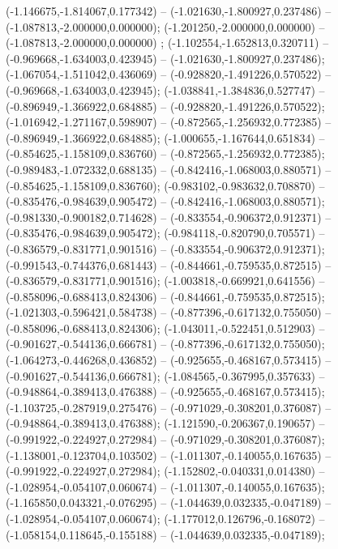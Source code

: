  (-1.146675,-1.814067,0.177342) -- (-1.021630,-1.800927,0.237486) -- (-1.087813,-2.000000,0.000000);
 (-1.201250,-2.000000,0.000000) -- (-1.087813,-2.000000,0.000000) ;
 (-1.102554,-1.652813,0.320711) -- (-0.969668,-1.634003,0.423945) -- (-1.021630,-1.800927,0.237486);
 (-1.067054,-1.511042,0.436069) -- (-0.928820,-1.491226,0.570522) -- (-0.969668,-1.634003,0.423945);
 (-1.038841,-1.384836,0.527747) -- (-0.896949,-1.366922,0.684885) -- (-0.928820,-1.491226,0.570522);
 (-1.016942,-1.271167,0.598907) -- (-0.872565,-1.256932,0.772385) -- (-0.896949,-1.366922,0.684885);
 (-1.000655,-1.167644,0.651834) -- (-0.854625,-1.158109,0.836760) -- (-0.872565,-1.256932,0.772385);
 (-0.989483,-1.072332,0.688135) -- (-0.842416,-1.068003,0.880571) -- (-0.854625,-1.158109,0.836760);
 (-0.983102,-0.983632,0.708870) -- (-0.835476,-0.984639,0.905472) -- (-0.842416,-1.068003,0.880571);
 (-0.981330,-0.900182,0.714628) -- (-0.833554,-0.906372,0.912371) -- (-0.835476,-0.984639,0.905472);
 (-0.984118,-0.820790,0.705571) -- (-0.836579,-0.831771,0.901516) -- (-0.833554,-0.906372,0.912371);
 (-0.991543,-0.744376,0.681443) -- (-0.844661,-0.759535,0.872515) -- (-0.836579,-0.831771,0.901516);
 (-1.003818,-0.669921,0.641556) -- (-0.858096,-0.688413,0.824306) -- (-0.844661,-0.759535,0.872515);
 (-1.021303,-0.596421,0.584738) -- (-0.877396,-0.617132,0.755050) -- (-0.858096,-0.688413,0.824306);
 (-1.043011,-0.522451,0.512903) -- (-0.901627,-0.544136,0.666781) -- (-0.877396,-0.617132,0.755050);
 (-1.064273,-0.446268,0.436852) -- (-0.925655,-0.468167,0.573415) -- (-0.901627,-0.544136,0.666781);
 (-1.084565,-0.367995,0.357633) -- (-0.948864,-0.389413,0.476388) -- (-0.925655,-0.468167,0.573415);
 (-1.103725,-0.287919,0.275476) -- (-0.971029,-0.308201,0.376087) -- (-0.948864,-0.389413,0.476388);
 (-1.121590,-0.206367,0.190657) -- (-0.991922,-0.224927,0.272984) -- (-0.971029,-0.308201,0.376087);
 (-1.138001,-0.123704,0.103502) -- (-1.011307,-0.140055,0.167635) -- (-0.991922,-0.224927,0.272984);
 (-1.152802,-0.040331,0.014380) -- (-1.028954,-0.054107,0.060674) -- (-1.011307,-0.140055,0.167635);
 (-1.165850,0.043321,-0.076295) -- (-1.044639,0.032335,-0.047189) -- (-1.028954,-0.054107,0.060674);
 (-1.177012,0.126796,-0.168072) -- (-1.058154,0.118645,-0.155188) -- (-1.044639,0.032335,-0.047189);
